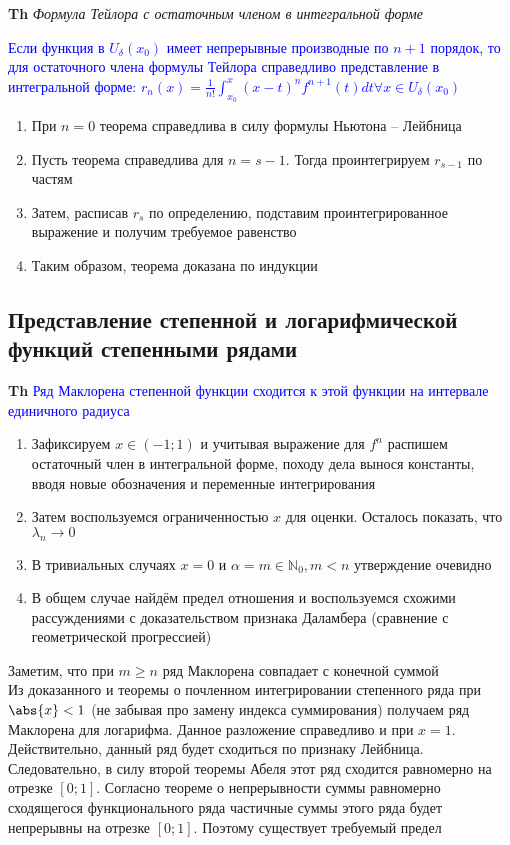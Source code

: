 \textbf{Th} \textit{Формула Тейлора с остаточным членом в интегральной форме}

\textcolor{blue}{Если функция в $U_\delta (x_0)$ имеет непрерывные производные по $n+1$ порядок, то для
остаточного члена формулы Тейлора справедливо представление в интегральной форме: $r_n (x) = \frac{1}{n!} \int_{
    x_0}^x (x - t)^n f^{n+1}(t)dt \forall x \in U_\delta (x_0) $}

\begin{enumerate}
    \item При $n = 0$ теорема справедлива в силу формулы Ньютона -- Лейбница
    \item Пусть теорема справедлива для $n = s - 1$.
    Тогда проинтегрируем $r_{s-1}$ по частям
    \item Затем, расписав $r_s$ по определению, подставим проинтегрированное выражение и получим требуемое равенство
    \item Таким образом, теорема доказана по индукции
\end{enumerate}

\subsection{Представление степенной и логарифмической функций степенными рядами}

\textbf{Th} \textcolor{blue}{Ряд Маклорена степенной функции сходится к этой функции на интервале единичного радиуса}

\begin{enumerate}
    \item Зафиксируем $x \in (-1; 1)$ и учитывая выражение для $f^{n}$ распишем остаточный член в интегральной
    форме, походу дела вынося константы, вводя новые обозначения и переменные интегрирования
    \item Затем воспользуемся ограниченностью $x$ для оценки.
    Осталось показать, что $\lambda_n \rightarrow 0$
    \item В тривиальных случаях $x = 0$ и $\alpha = m \in \mathbb{N}_0, m < n$ утверждение очевидно
    \item В общем случае найдём предел отношения и воспользуемся схожими рассуждениями с доказательством признака
    Даламбера (сравнение с геометрической прогрессией)
\end{enumerate}

Заметим, что при $m \geq n$ ряд Маклорена совпадает с конечной суммой \\

Из доказанного и теоремы о почленном интегрировании степенного ряда при $\abs{x} < 1$ (не забывая про замену
индекса суммирования) получаем ряд Маклорена для логарифма.
Данное разложение справедливо и при $x = 1$.
Действительно, данный ряд будет сходиться по признаку Лейбница.
Следовательно, в силу второй теоремы Абеля этот ряд сходится равномерно на отрезке $[0; 1]$.
Согласно теореме о непрерывности суммы равномерно сходящегося функционального ряда частичные суммы этого ряда будет
непрерывны на отрезке $[0; 1]$.
Поэтому существует требуемый предел